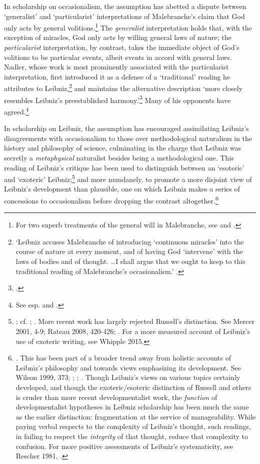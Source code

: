 \documentclass{article}
\begin{document}
In scholarship on occasionalism, the assumption has abetted a dispute
between `generalist' and `particularist' interpretations of
Malebranche's claim that God only acts by general volitions.\footnote{For
  two superb treatments of the general will in Malebranche, see \autocite{Schmaltz2008} and \autocite{Wahl2011}.} The \emph{generalist} interpretation holds that,
with the exception of miracles, God only acts by willing general laws of
nature; the \emph{particularist} interpretation, by contrast, takes the
immediate object of God's volitions to be particular events, albeit
events in accord with general laws. Nadler, whose work is most
prominently associated with the particularist interpretation, first
introduced it as a defense of a `traditional' reading he attributes to
Leibniz,\footnote{`Leibniz accuses Malebranche of introducing
  `continuous miracles' into the course of nature at every moment, and
  of having God `intervene' with the laws of bodies and of thought.
  \ldots I shall argue that we ought to keep to this traditional
  reading of Malebranche's occasionalism.' \autocite[32]{Nadler1993}.} and
maintains the alternative description `more closely resembles Leibniz's
preestablished harmony.'\footnote{\autocite[31]{Nadler1993}.} Many of his
opponents have agreed.\footnote{See esp. \autocite{Clarke1995} and \autocite{Scott1997}.}

In scholarship on Leibniz, the assumption has encouraged assimilating
Leibniz's disagreements with occasionalism to those over methodological
naturalism in the history and philosophy of science, culminating in the
charge that Leibniz was secretly a \emph{metaphysical} naturalist
besides being a methodological one. This reading of Leibniz's critique
has been used to distinguish between an `esoteric' and `exoteric'
Leibniz;\footnote{\autocite{Russell1951}; cf. \autocite{Shields1986}; \autocite[277-281]{Wilson1989}.
  More recent work has largely rejected Russell's distinction. See
  Mercer 2001, 4-9; Rateau 2008, 420-426; \autocite{Antognazza2009}. For a more
  measured account of Leibniz's use of exoteric writing, see Whipple
  2015.} and more mundanely, to promote a more disjoint view of
Leibniz's development than plausible, one on which Leibniz makes a
series of concessions to occasionalism before dropping the contrast
altogether.\footnote{\autocite{Scott1997}. This has been part of a broader trend
  away from holistic accounts of Leibniz's philosophy and towards views
  emphasizing its development. See Wilson 1999, 373; \autocite[78]{Garber2008};
  \autocite[388]{Garber2009}; \autocite[223-232]{Garber2014}. Though Leibniz's views on various topics
  certainly developed, and though the exoteric/esoteric distinction of
  Russell and others is cruder than more recent developmentalist work,
  the \emph{function} of developmentalist hypotheses in Leibniz
  scholarship has been much the same as the earlier distinction:
  fragmentation at the service of manageability. While paying verbal
  respects to the complexity of Leibniz's thought, such readings, in
  failing to respect the \emph{integrity} of that thought, reduce that
  complexity to confusion. For more positive assessments of Leibniz's
  systematicity, see Rescher 1981, \autocite{Goldenbaum2002}.}
\end{document}
